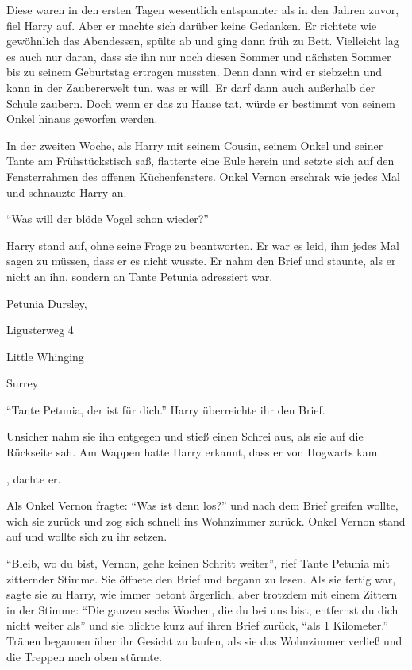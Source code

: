 Diese waren in den ersten Tagen wesentlich entspannter als in den Jahren zuvor, fiel Harry auf. Aber er machte sich darüber keine Gedanken. Er richtete wie gewöhnlich das Abendessen, spülte ab und ging dann früh zu Bett. Vielleicht lag es auch nur daran, dass sie ihn nur noch diesen Sommer und nächsten Sommer bis zu seinem Geburtstag ertragen mussten. Denn dann wird er siebzehn und kann in der Zaubererwelt tun, was er will. Er darf dann auch außerhalb der Schule zaubern. Doch wenn er das zu Hause tat, würde er bestimmt von seinem Onkel hinaus geworfen werden.

In der zweiten Woche, als Harry mit seinem Cousin, seinem Onkel und seiner Tante am Frühstückstisch saß, flatterte eine Eule herein und setzte sich auf den Fensterrahmen des offenen Küchenfensters. Onkel Vernon erschrak wie jedes Mal und schnauzte Harry an.

\enquote{Was will der blöde Vogel schon wieder?}

Harry stand auf, ohne seine Frage zu beantworten. Er war es leid, ihm jedes Mal sagen zu müssen, dass er es nicht wusste. Er nahm den Brief und staunte, als er nicht an ihn, sondern an Tante Petunia adressiert war.

\begin{brief}
Petunia Dursley,

Ligusterweg 4

Little Whinging

Surrey
\end{brief}

\enquote{Tante Petunia, der ist für dich.} Harry überreichte ihr den Brief.

Unsicher nahm sie ihn entgegen und stieß einen Schrei aus, als sie auf die Rückseite sah. Am Wappen hatte Harry erkannt, dass er von Hogwarts kam. 

, dachte er.  

Als Onkel Vernon fragte: \enquote{Was ist denn los?} und nach dem Brief greifen wollte, wich sie zurück und zog sich schnell ins Wohnzimmer zurück. Onkel Vernon stand auf und wollte sich zu ihr setzen.

\enquote{Bleib, wo du bist, Vernon, gehe keinen Schritt weiter}, rief Tante Petunia mit zitternder Stimme. Sie öffnete den Brief und begann zu lesen. Als sie fertig war, sagte sie zu Harry, wie immer betont ärgerlich, aber trotzdem mit einem Zittern in der Stimme: \enquote{Die ganzen sechs Wochen, die du bei uns bist, entfernst du dich nicht weiter als} und sie blickte kurz auf ihren Brief zurück, \enquote{als 1 Kilometer.} Tränen begannen über ihr Gesicht zu laufen, als sie das Wohnzimmer verließ und die Treppen nach oben stürmte.

